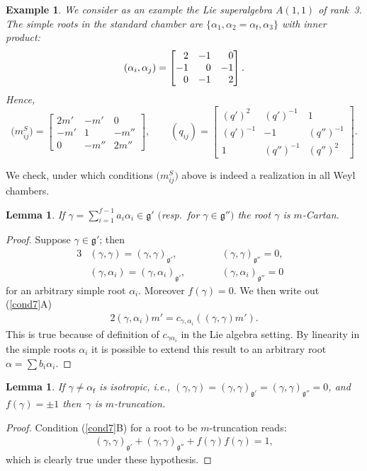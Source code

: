 \documentclass[pdftex]{sigma}%
\numberwithin{equation}{section}
\newtheorem{lem}[teo]{Lemma}
\newtheorem{ese}[teo]{Example}
\newcommand{\f}{\mathsf{f}}
\begin{document}
\begin{ese}\label{A(1,1)}
We consider as an example the Lie superalgebra ${A(1,1)}$ of rank~3.
The simple roots in the standard chamber are $\lbrace\alpha_1,   \alpha_2 = \alpha_\f,   \alpha_3\rbrace$ with inner product:
\[
(\alpha_i, \alpha_j)= \begin{bmatrix}
 \hphantom{-}2 & -1 & \hphantom{-}0\\
 -1 &   \hphantom{-}0 & -1 \\
 \hphantom{-}0 & -1 & \hphantom{-}2
\end{bmatrix}.
\]
Hence,
\[
\big(m_{ij}^S\big)= \begin{bmatrix}
 2m' & -m' & 0\\
 -m' &   1 & -m'' \\
 0 & -m'' & 2m''
\end{bmatrix}, \qquad
(q_{ij})= \begin{bmatrix}
 (q')^2 & (q')^{-1} & 1\\
  (q')^{-1} &   -1 & (q'')^{-1} \\
 1 & (q'')^{-1} & (q'')^2
\end{bmatrix}.
\]
 \end{ese}
We check, under which conditions $\big(m_{ij}^S\big)$ above is indeed a realization in all Weyl chambers.
\begin{lem}\label{onebossector}
	 If $\gamma= \sum_{i=1}^{f-1} a_i \alpha_i\in\mathfrak{g'}$ $($resp.\ for $\gamma \in \mathfrak{g''})$ the root $\gamma$ is $m$-Cartan.
	 \end{lem}
\begin{proof}
Suppose $\gamma \in \mathfrak{g'}$; then
\begin{alignat*}{3}
&(\gamma, \gamma)= (\gamma, \gamma)_\mathfrak{g'}, \qquad && (\gamma, \gamma)_\mathfrak{g''}=0,& \\
& (\gamma, \alpha_i)= (\gamma, \alpha_i)_\mathfrak{g'}, \qquad&& (\gamma, \alpha_i)_\mathfrak{g''}=0&
\end{alignat*}	
for an arbitrary simple root $\alpha_i$. Moreover $f(\gamma)=0$.
We then write out {\rm (\ref{cond7}A)}
\begin{gather*}
2(\gamma, \alpha_i) m'  = c_{\gamma,\alpha_i}((\gamma, \gamma) m').
\end{gather*}
This is true because of definition of $c_{\gamma\alpha_i}$ in the Lie algebra setting.
By linearity in the simple roots $\alpha_i$ it is possible to extend this result to an arbitrary root $\alpha = \sum b_i \alpha_i$.
\end{proof}	
\begin{lem}\label{isofermions} If $\gamma \neq \alpha_\f$ is isotropic, i.e., $(\gamma, \gamma) =(\gamma, \gamma)_\mathfrak{g'}= (\gamma, \gamma)_\mathfrak{g''}= 0$, and $f(\gamma) = \pm 1$ then~$\gamma$ is $m$-truncation.
\end{lem}
\begin{proof}
Condition (\ref{cond7}B) for a root to be $m$-truncation reads:
\begin{gather*}
(\gamma, \gamma)_\mathfrak{g'} + (\gamma, \gamma)_\mathfrak{g''} + f(\gamma)f(\gamma) = 1,
\end{gather*}
which is clearly true under these hypothesis.
\end{proof}	
\end{document}
